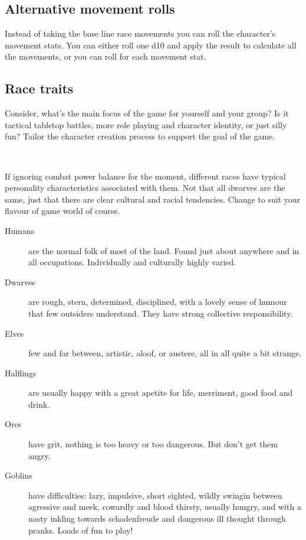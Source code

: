 \subsection*{Alternative movement rolls}
Instead of taking the base line race movements you can roll the character's movement stats. You can either roll one d10 and apply the result to calculate all the movements, or you can roll for each movement stat.


\subsection*{Race traits}
Consider, what's the main focus of the game for yourself and your group? Is it tactical tabletop battles, more role playing and character identity, or just silly fun? Tailor the character creation process to support the goal of the game.

\

If ignoring combat power balance for the moment, different races have typical personality characteristics associated with them. Not that all dwarves are the same, just that there are clear cultural and racial tendencies. Change to suit your flavour of game world of course.

\begin{description}
\item[Humans] are the normal folk of most of the land. Found just about anywhere and in all occupations. Individually and culturally highly varied.
\item[Dwarves] are rough, stern, determined, disciplined, with a lovely sense of humour that few outsiders understand. They have strong collective responsibility.
\item[Elves] few and far between, artistic, aloof, or austere, all in all quite a bit strange. 
\item[Halflings] are usually happy with a great apetite for life, merriment, good food and drink.
\item[Orcs] have grit, nothing is too heavy or too dangerous. But don't get them angry.
\item[Goblins] have difficulties: lazy, impulsive, short sighted, wildly swingin between agressive and meek, cowardly and blood thirsty, usually hungry, and with a nasty inkling towards schadenfreude and dangerous ill thought through pranks. Loads of fun to play!
\end{description}

